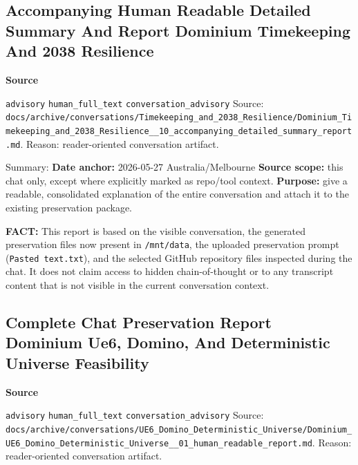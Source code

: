 \documentclass[9pt,a4paper,openany]{book}
\newcommand{\vonecallout}[3]{\par\medskip\noindent\begingroup\setlength{\fboxsep}{7pt}\colorbox{DomCalloutBg}{\parbox{0.94\linewidth}{\textbf{\textcolor{#1}{#2}}\par #3}}\endgroup\par\medskip}
\begin{document}
\subsection{Accompanying Human Readable Detailed Summary And Report Dominium Timekeeping And 2038 Resilience}

\vonecallout{DomSlate}{Source}{\texttt{advisory} \texttt{human\_\allowbreak{}full\_\allowbreak{}text} \texttt{conversation\_\allowbreak{}advisory} Source: \texttt{docs/\allowbreak{}archive/\allowbreak{}conversations/\allowbreak{}Timekeeping\_\allowbreak{}and\_\allowbreak{}2038\_\allowbreak{}Resilience/\allowbreak{}Dominium\_\allowbreak{}Timekeeping\_\allowbreak{}and\_\allowbreak{}2038\_\allowbreak{}Resilience\_\allowbreak{}\_\allowbreak{}10\_\allowbreak{}accompanying\_\allowbreak{}detailed\_\allowbreak{}summary\_\allowbreak{}report.\allowbreak{}md}.\allowbreak{} Reason: reader-\allowbreak{}oriented conversation artifact.\allowbreak{}}

Summary: \textbf{Date anchor:} 2026-\allowbreak{}05-\allowbreak{}27 Australia/\allowbreak{}Melbourne \textbf{Source scope:} this chat only, except where explicitly marked as repo/\allowbreak{}tool context.\allowbreak{} \textbf{Purpose:} give a readable, consolidated explanation of the entire conversation and attach it to the existing preservation package.\allowbreak{}


\textbf{FACT:} This report is based on the visible conversation, the generated preservation files now present in \texttt{/\allowbreak{}mnt/\allowbreak{}data}, the uploaded preservation prompt (\texttt{Pasted text.\allowbreak{}txt}), and the selected GitHub repository files inspected during the chat.\allowbreak{} It does not claim access to hidden chain-\allowbreak{}of-\allowbreak{}thought or to any transcript content that is not visible in the current conversation context.\allowbreak{}



\subsection{Complete Chat Preservation Report Dominium Ue6, Domino, And Deterministic Universe Feasibility}

\vonecallout{DomSlate}{Source}{\texttt{advisory} \texttt{human\_\allowbreak{}full\_\allowbreak{}text} \texttt{conversation\_\allowbreak{}advisory} Source: \texttt{docs/\allowbreak{}archive/\allowbreak{}conversations/\allowbreak{}UE6\_\allowbreak{}Domino\_\allowbreak{}Deterministic\_\allowbreak{}Universe/\allowbreak{}Dominium\_\allowbreak{}UE6\_\allowbreak{}Domino\_\allowbreak{}Deterministic\_\allowbreak{}Universe\_\allowbreak{}\_\allowbreak{}01\_\allowbreak{}human\_\allowbreak{}readable\_\allowbreak{}report.\allowbreak{}md}.\allowbreak{} Reason: reader-\allowbreak{}oriented conversation artifact.\allowbreak{}}
\end{document}
